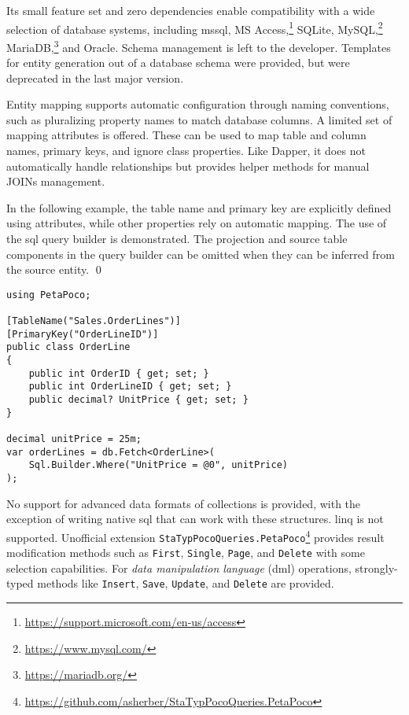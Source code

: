 Its small feature set and zero dependencies enable compatibility with a wide selection of database systems, including \acrshort{mssql}, MS Access,\footnote{\url{https://support.microsoft.com/en-us/access}} SQLite, MySQL,\footnote{\url{https://www.mysql.com/}} MariaDB,\footnote{\url{https://mariadb.org/}} and Oracle. Schema management is left to the developer. Templates for entity generation out of a database schema were provided, but were deprecated in the last major version.

Entity mapping supports automatic configuration through naming conventions, such as pluralizing property names to match database columns. A limited set of mapping attributes is offered. These can be used to map table and column names, primary keys, and ignore class properties. Like Dapper, it does not automatically handle relationships but provides helper methods for manual JOINs management.

\begin{example}
\small
In the following example, the table name and primary key are explicitly defined using attributes, while other properties rely on automatic mapping. The use of the \acrshort{sql} query builder is demonstrated. The projection and source table components in the query builder can be omitted when they can be inferred from the source entity.
\qed

\begin{lstlisting}[language=CSharp]
using PetaPoco;

[TableName("Sales.OrderLines")]
[PrimaryKey("OrderLineID")]
public class OrderLine
{
    public int OrderID { get; set; }
    public int OrderLineID { get; set; }
    public decimal? UnitPrice { get; set; }
}

decimal unitPrice = 25m;
var orderLines = db.Fetch<OrderLine>(
    Sql.Builder.Where("UnitPrice = @0", unitPrice)
);
\end{lstlisting}
\end{example}

No support for advanced data formats of collections is provided, with the exception of writing native \acrshort{sql} that can work with these structures. \acrshort{linq} is not supported. Unofficial extension \texttt{StaTypPocoQueries.PetaPoco}\footnote{\url{https://github.com/asherber/StaTypPocoQueries.PetaPoco}} provides result modification methods such as \texttt{First}, \texttt{Single}, \texttt{Page}, and \texttt{Delete} with some selection capabilities. For \textit{data manipulation language} (\acrshort{dml}) operations, strongly-typed methods like \texttt{Insert}, \texttt{Save}, \texttt{Update}, and \texttt{Delete} are provided. 

